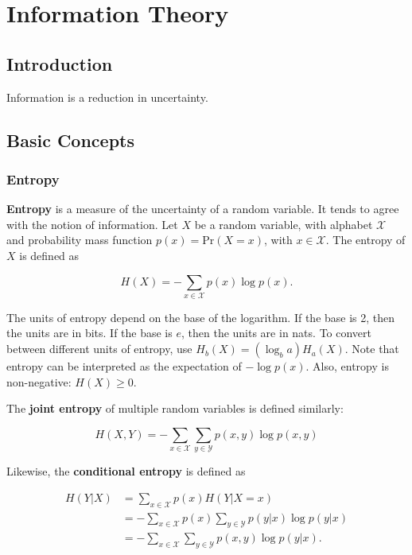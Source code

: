 \chapter{Information Theory}
\label{chap: information theory}

\section{Introduction}

Information is a reduction in uncertainty.

\section{Basic Concepts}

\subsection{Entropy}

\textbf{Entropy} is a measure of the uncertainty of a random variable. It tends to agree with the notion of information. Let $X$ be a random variable, with alphabet $\mathcal{X}$ and probability mass function $p(x) = \text{Pr} (X = x)$, with $x \in \mathcal{X}$. The entropy of $X$ is defined as

\begin{equation}
	H(X) = - \sum_{x \in \mathcal{X}} p(x) \log p(x).
	\label{eq: entropy_definition}
\end{equation}

\noindent The units of entropy depend on the base of the logarithm. If the base is 2, then the units are in bits. If the base is $e$, then the units are in nats. To convert between different units of entropy, use $H_b (X) = (\log_b a) H_a (X)$. Note that entropy can be interpreted as the expectation of $-\log p(x)$. Also, entropy is non-negative: $H(X) \geq 0$.

The \textbf{joint entropy} of multiple random variables is defined similarly:

\begin{equation}
	H(X, Y) = - \sum_{x \in \mathcal{X}} \sum_{y \in \mathcal{Y}} p(x, y) \log p(x, y)
	\label{eq: joint_entropy_definition}
\end{equation}

\noindent Likewise, the \textbf{conditional entropy} is defined as

\begin{align*}
	H(Y | X) &= \sum_{x \in \mathcal{X}} p(x) H(Y | X = x) \\
		     &= - \sum_{x \in \mathcal{X}} p(x) \sum_{y \in \mathcal{Y}} p(y | x) \log p(y | x) \\
		     &= - \sum_{x \in \mathcal{X}} \sum_{y \in \mathcal{Y}} p(x, y) \log p(y | x).
	\label{eq: conditional_entropy_definition}
\end{align*}

